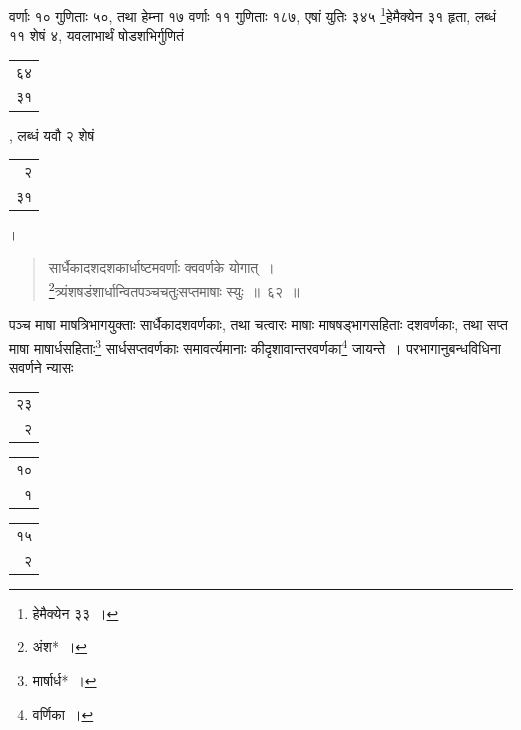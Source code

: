 \documentclass[10pt, openany]{book}
\begin{document}
{{{
{वर्णाः १० गुणिताः ५०, तथा हेम्ना १७ वर्णाः ११ गुणिताः १८७, एषां युतिः
३४५ \renewcommand{\thefootnote}{\s ८}\footnote{\s हेमैक्येन ३३~।}हेमैक्येन ३१ हृता, लब्धं ११ शेषं ४, यवलाभार्थं षोडशभिर्गुणितं\begin{tabular}{r}६४\\३१\end{tabular},
लब्धं यवौ २ शेषं\begin{tabular}{r}२\\३१\end{tabular}।}

\vspace{0.3cm}{उदाहरणम्\textemdash}

\begin{quote}
    
{\eg सार्धैकादशदशकार्धाष्टमवर्णाः क्ववर्णके योगात्~। \\
 \renewcommand{\thefootnote}{\s ९}\footnote{\s अंश*~।}त्र्यंशषडंशार्धान्वितपञ्चचतुःसप्तमाषाः स्युः~॥~६२~॥}\end{quote}

\newpage

{पञ्च माषा माषत्रिभागयुक्ताः सार्धैकादशवर्णकाः, तथा चत्वारः माषाः
माषषड्भागसहिताः दशवर्णकाः, तथा सप्त माषा माषार्धसहिताः\renewcommand{\thefootnote}{\s १}\footnote{\s मार्षार्ध*~।} सार्धसप्तवर्णकाः
समावर्त्यमानाः कीदृशावान्तरवर्णका\renewcommand{\thefootnote}{\s २}\footnote{\s *वर्णिका~।}  जायन्ते~। परभागानुबन्धविधिना सवर्णने न्यासः\textemdash}
\vspace{2mm}

\hspace{40mm} \begin{tabular}{r|} २३ \\ २ \\
\hline \end{tabular}\begin{tabular}{r|}१० \\१ \\
\hline \end{tabular}\begin{tabular}{r}१५\\ २\\
\hline \end{tabular}

}}}
\end{document}
